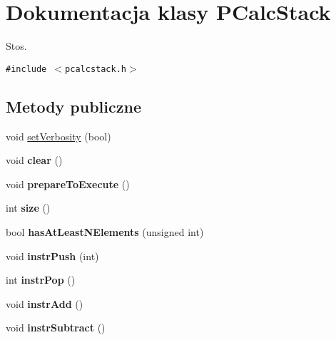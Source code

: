 \hypertarget{classPCalcStack}{
\section{Dokumentacja klasy PCalcStack}
\label{classPCalcStack}
}
Stos.  


{\tt \#include $<$pcalcstack.h$>$}

\subsection*{Metody publiczne}
\begin{CompactItemize}
\item 
void \hyperlink{classPCalcStack_6a831a20f4dec457de9f880202cf2e33}{setVerbosity} (bool)
\item 
\hypertarget{classPCalcStack_7b1abd7a77db664dcf9e0bd56c17301f}{
void \textbf{clear} ()}
\label{classPCalcStack_7b1abd7a77db664dcf9e0bd56c17301f}

\item 
\hypertarget{classPCalcStack_b3129921fea95a4df231201e2601e1c0}{
void \textbf{prepareToExecute} ()}
\label{classPCalcStack_b3129921fea95a4df231201e2601e1c0}

\item 
\hypertarget{classPCalcStack_e334a37c1749b028e75e0d251afe47f7}{
int \textbf{size} ()}
\label{classPCalcStack_e334a37c1749b028e75e0d251afe47f7}

\item 
\hypertarget{classPCalcStack_39d4d9e53e8b57fa934ee1a5b9171dc8}{
bool \textbf{hasAtLeastNElements} (unsigned int)}
\label{classPCalcStack_39d4d9e53e8b57fa934ee1a5b9171dc8}

\item 
\hypertarget{classPCalcStack_269ca0f8f0a4395a0035fa0a9bc813a1}{
void \textbf{instrPush} (int)}
\label{classPCalcStack_269ca0f8f0a4395a0035fa0a9bc813a1}

\item 
\hypertarget{classPCalcStack_796ba40ffc60b05a8a116d881aa2e37f}{
int \textbf{instrPop} ()}
\label{classPCalcStack_796ba40ffc60b05a8a116d881aa2e37f}

\item 
\hypertarget{classPCalcStack_04ef30536acac1b02093153f1cb83353}{
void \textbf{instrAdd} ()}
\label{classPCalcStack_04ef30536acac1b02093153f1cb83353}

\item 
\hypertarget{classPCalcStack_a35493e8dc971fc2f47a113a6d400784}{
void \textbf{instrSubtract} ()}
\label{classPCalcStack_a35493e8dc971fc2f47a113a6d400784}


\end{CompactItemize}
